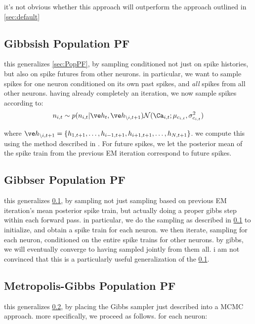 it's not obvious whether this approach will outperform the approach outlined in \ref{sec:default}

\subsection{Gibbsish Population PF} \label{sec:G1PF}

this generalizes \ref{sec:PopPF}, by sampling conditioned not just on spike histories, but also on spike futures from other neurons.  in particular, we want to sample spikes for one neuron conditioned on its own past spikes, and \emph{all} spikes from all other neurons.  having already completely an iteration, we now sample spikes according to:
\begin{align}
n_{i,t} \sim p(n_{i,t} | \h_t, \h_{\backslash i, t+1}) \mathcal{N}(\Ca_{i,t}; \mu_{c_{i,t}}, \sigma^2_{c_{i,t}})
\end{align}

\noindent where $\h_{\backslash i,t+1}=\{h_{1,t+1}, \ldots, h_{i-1,t+1}, h_{i+1,t+1}, \ldots, h_{N,t+1}\}$.  we compute this using the method described in \cite{PillowLatham07}.  For future spikes, we let the posterior mean of the spike train from the previous EM iteration correspond to future spikes.

\subsection{Gibbser Population PF} \label{sec:G2PF}

this generalizes \ref{sec:G1PF}, by sampling not just sampling based on previous EM iteration's mean posterior spike train, but actually doing a proper gibbs step within each forward pass. in particular, we do the sampling as described in \ref{sec:G1PF} to initialize, and obtain a spike train for each neuron.  we then iterate, sampling for each neuron, conditioned on the entire spike trains for other neurons.  by gibbs, we will eventually converge to having sampled jointly from them all. i am not convinced that this is a particularly useful generalization of the \ref{sec:G1PF}.


\subsection{Metropolis-Gibbs Population PF} \label{sec:G3PF}

this generalizes \ref{sec:G2PF}, by placing the Gibbs sampler just described into a MCMC approach.  more specifically, we proceed as follows. for each neuron:


